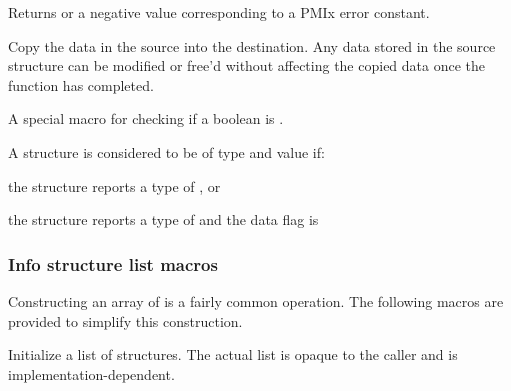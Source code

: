 \begin{arglist}
\end{arglist}

Returns  or a negative value corresponding to a PMIx error constant.

\descr

Copy the data in the source  into the destination. Any data stored in the source structure can be modified or free'd without affecting the copied data once the function has completed.


A special macro for checking if a boolean  is .


\begin{arglist}
\end{arglist}

A  structure is considered to be of type  and value  if:

\begin{compactitemize}
    \item the structure reports a type of , or
    \item the structure reports a type of  and the data flag is 
\end{compactitemize}

\subsubsection{Info structure list macros}
Constructing an array of  is a fairly common operation. The following macros are provided to simplify this construction.


\summary

Initialize a list of  structures. The actual list is opaque to the caller and is implementation-dependent.

